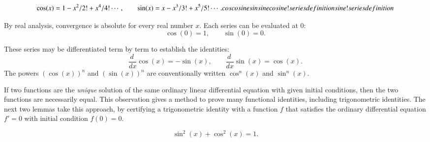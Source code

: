 \begin{equation}\label{eqn:cos-def}\cos(x) = 1 - x^2/2! + x^4/4! \cdots,\qquad
  \sin(x) = x - x^3/3! + x^5/5! \cdots.
  \indy{Notation}{cos}%
  \indy{Index}{cosine}%
  \indy{Notation}{sin}%
  \indy{Index}{sine}%
  \indy{Index}{cosine!series definition}%
  \indy{Index}{sine!series definition}%
\end{equation}
%
\figODPCVGH %

By real analysis, convergence is absolute
for every real number $x$.  Each series can be evaluated at $0$:
\begin{equation}\label{eqn:cos0}
  \cos(0) = 1,\qquad \sin(0) = 0.
\end{equation}


These series may be differentiated term by term to establish the
identities: %
\begin{equation}\label{eqn:cos'}
\frac{d\phantom{~}} {dx}\cos(x) 
= -\sin(x),\qquad \frac{ d\phantom{~} }{dx}\sin(x) = \cos(x).
\end{equation}
%
The powers $(\cos(x))^n$ and $(\sin(x))^n$ are conventionally written
$\cos^n(x)$ and $\sin^n(x)$.

If two functions are the {\it unique} solution of the same ordinary
linear differential equation with given initial conditions, then the
two functions are necessarily equal.  This observation gives
 a method to prove many functional identities,
including trigonometric identities.  
The next two lemmas take this approach, by
 certifying a trigonometric identity with a function $f$ that
satisfies the ordinary differential equation $f' = 0$ with initial
condition $f(0)=0$.  %

\begin{lemma}[]
\label{lemma:circle} 
\[ 
\sin^2(x) + \cos^2(x) = 1.
\] 
\end{lemma}
%

